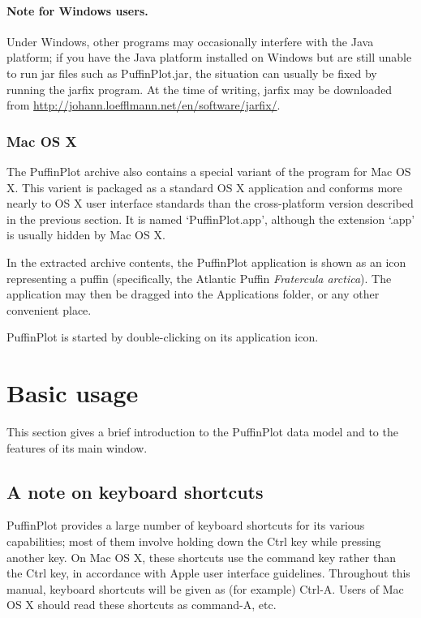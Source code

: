 \documentclass[a4paper,british]{article}
\newcommand{\ppcmd}[1]{\textsf{#1}} %
\begin{document}
\paragraph{Note for Windows users.} Under Windows, other programs may
occasionally interfere with the Java platform; if you have the Java platform
installed on Windows but are still unable to run \ppcmd{jar} files such as
\ppcmd{PuffinPlot.jar}, the situation can usually be fixed by running the
\ppcmd{jarfix} program. At the time of writing, \ppcmd{jarfix} may be
downloaded from \url{http://johann.loefflmann.net/en/software/jarfix/}.

\subsubsection{Mac OS X}

The PuffinPlot archive also contains a special variant of the program for Mac
OS X. This varient is packaged as a standard OS X application and conforms
more nearly to OS X user interface standards than the cross-platform version
described in the previous section. It is named `PuffinPlot.app', although 
the extension `.app' is usually hidden by Mac OS X.

In the extracted archive contents, the PuffinPlot application is shown as an
icon representing a puffin (specifically, the Atlantic Puffin
\emph{Fratercula arctica}). The application may then be dragged into the
Applications folder, or any other convenient place.

PuffinPlot is started by double-clicking on its application icon.

\section{Basic usage}

This section gives a brief introduction to the PuffinPlot data model and
to the features of its main window.

\subsection{A note on keyboard shortcuts}

PuffinPlot provides a large number of keyboard shortcuts for its various
capabilities; most of them involve holding down the Ctrl key while
pressing another key. On Mac OS X, these shortcuts use the command key
rather than the Ctrl key, in accordance with Apple user interface
guidelines. Throughout this manual, keyboard shortcuts will be given as
(for example) Ctrl-A. Users of Mac OS X should read these shortcuts as
command-A, etc.
\end{document}
